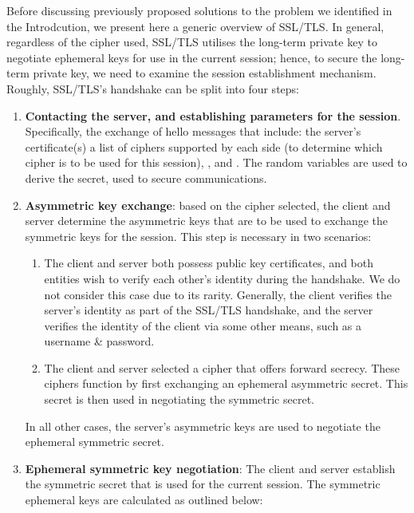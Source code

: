 \documentclass[../main.tex]{subfiles}
\begin{document}
\label{sec:ssloverview}
Before discussing previously proposed solutions to the problem we
identified in the Introdcution, we present here a generic overview of
SSL/TLS. In general, regardless of the cipher used, SSL/TLS utilises
the long-term private key to negotiate ephemeral keys for use in the
current session; hence, to secure the long-term private key, we need
to examine the session establishment mechanism. Roughly, SSL/TLS's
handshake can be split into four steps:

\begin{enumerate}
  \item \textbf{Contacting the server, and establishing parameters for
    the session}. Specifically, the exchange of hello messages that
    include: the server's certificate(s) a list of ciphers supported by
    each side (to determine which cipher is to be used for this session),
    \srandom, and \crandom. The random variables are used to derive the
    secret, used to secure communications.
  \item \textbf{Asymmetric key exchange}: based on the cipher
    selected, the client and server determine the asymmetric keys that are
    to be used to exchange the symmetric keys for the session. This step
    is necessary in two scenarios:
    \begin{enumerate}
      \item The client and server both possess public key
        certificates, and both entities wish to verify each other's identity
        during the handshake. We do not consider this case due to its
        rarity. Generally, the client verifies the server's identity as part
        of the SSL/TLS handshake, and the server verifies the identity of the
        client via some other means, such as a username \& password.
      \item The client and server selected a cipher that offers
        forward secrecy. These ciphers function by first exchanging an
        ephemeral asymmetric secret. This secret is then used in negotiating
        the symmetric secret.
    \end{enumerate} In all other cases, the server's asymmetric keys
    are used to negotiate the ephemeral symmetric secret.
  \item \textbf{Ephemeral symmetric key negotiation}: The client and
    server establish the symmetric secret that is used for the current
    session. The symmetric ephemeral keys are calculated as outlined
    below:


\end{enumerate}
\end{document}
